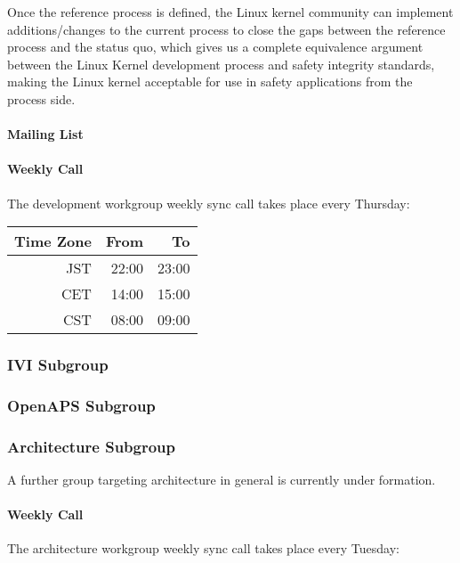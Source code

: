 \documentclass[12pt]{ElisaPaper}
\begin{document}
Once the reference process is defined, the Linux kernel community can implement additions/changes to the current process to close the gaps between the reference process and the status quo, which gives us a complete equivalence argument between the Linux Kernel development process and safety integrity standards, making the Linux kernel acceptable for use in safety applications from the process side.

\paragraph{Mailing List}

\paragraph{Weekly Call}
The development workgroup weekly sync call takes place every Thursday:

\begin{center}
\begin{tabular}{rrr}
		\toprule
		Time Zone & From & To\\
		\midrule
		JST & 22:00 & 23:00 \\
		CET	& 14:00 & 15:00 \\
		CST & 08:00 & 09:00 \\
	\bottomrule
\end{tabular} 
\end{center}
\subsubsection{IVI Subgroup}
\label{sssec:IVI Subgroup}
\subsubsection{OpenAPS Subgroup}
\label{sssec:OpenAPS subgroup}
\subsubsection{Architecture Subgroup}
A further group targeting architecture in general is currently under formation.
\paragraph{Weekly Call}
The architecture workgroup weekly sync call takes place every Tuesday:
\end{document}
